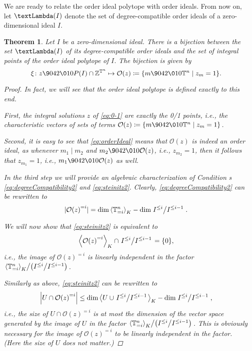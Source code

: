 \documentclass[11pt,oneside,english]{amsart}
\makeatletter
\numberwithin{equation}{section}
\numberwithin{figure}{section}
\theoremstyle{plain}
\newtheorem{thm}{Theorem}[section]
\theoremstyle{definition}
\theoremstyle{definition}
\theoremstyle{remark}
\theoremstyle{plain}
\theoremstyle{plain}
\theoremstyle{plain}
\theoremstyle{problem@}
\makeatother
\begin{document}
We are ready to relate the order ideal polytope with
order ideals.
From now on,
let \({\textLambda}(I)\) denote the set of degree-compatible order ideals
of a zero-dimensional ideal \(I\).
\begin{thm}
  \label{thm:polytope=order-ideal}
  Let \(I\) be a zero-dimensional ideal.
  There is a bijection between
  the set ${\textLambda}(I)$ of its degree-compatible order ideals and
  the set of integral points of the order ideal polytope of \(I\).
  The bijection is given by
  \[
  \xi \colon z {\9042\010} P(I) \cap {\mathbb{Z}}^{{\mathbb{T}}^n} \mapsto
  {\mathcal{O}}(z) \coloneqq \{ m {\9042\010} {\mathbb{T}}^n \mid z_{m}= 1\}.
  \]
\begin{proof}
In fact, we will see that the order ideal polytope is defined
exactly to this end.

First,
the integral solutions \(z\) of \autoref{eq:0-1}
are exactly the 0/1 points, i.e.,
the characteristic vectors
of sets of terms ${\mathcal{O}}(z)\coloneqq \{ m {\9042\010} {\mathbb{T}}^n \mid z_{m}=1 \}$.

Second, it is easy to see that
\autoref{eq:orderIdeal} means that
${\mathcal{O}}(z)$ is indeed an order ideal, as whenever
$m_{1} \mid m_{2}$ and $m_{2}{\9042\010}{\mathcal{O}}(z)$, i.e., $z_{m_{2}}=1$, then
it follows that $z_{m_{1}}=1$, i.e., $m_{1}{\9042\010}{\mathcal{O}}(z)$ as well.

In the third step we will provide an algebraic characterization
of {Condition} s \ref{eq:degreeCompatibility2} and \ref{eq:steinitz2}.
Clearly, \autoref{eq:degreeCompatibility2}
can be rewritten to
\[
\lvert {{\mathcal{O}}(z)}^{=i} \rvert = \dim{{\left\langle {{\mathbb{T}}^n_{=i}}\right\rangle}\sb{K}} -
\dim \left. I^{\leq i} \middle/ I^{\leq i-1} \right. .
\]

We will now show that \autoref{eq:steinitz2} is equivalent
to
\begin{equation}
\label{eq:disjoint}
{{\left\langle {{{\mathcal{O}}(z)}^{=i}}\right\rangle}\sb{K}}\cap\left. I^{\leq i} \middle/ I^{\leq i-1} \right.=\{0\},
\end{equation}
i.e., the image of \({{\mathcal{O}}(z)}^{=i}\) is linearly independent in the factor
\(\left. {{\left\langle {{\mathbb{T}}^n_{=i}}\right\rangle}\sb{K}} \middle/
  \left( I^{\leq i} \middle/ I^{\leq i-1} \right) \right.\).

Similarly as above,
\autoref{eq:steinitz2}
can be rewritten to
\begin{equation*}
    \left\lvert U \cap {{\mathcal{O}}(z)}^{=i} \right\rvert \leq
      \dim{{\left\langle {U \cup \left. I^{\leq i} \middle/ I^{\leq i-1} \right.}\right\rangle}\sb{K}} -
      \dim \left. I^{\leq i} \middle/ I^{\leq i-1} \right.,
\end{equation*}
i.e., the size of \(U \cap {{\mathcal{O}}(z)}^{=i}\) is at most
the dimension of the vector space generated by the image of \(U\) in
the factor
\(\left. {{\left\langle {{\mathbb{T}}^n_{=i}}\right\rangle}\sb{K}} \middle/
  \left( I^{\leq i} \middle/ I^{\leq i-1} \right) \right.\).
This is obviously \emph{necessary} for
the image of \({{\mathcal{O}}(z)}^{=i}\) to be linearly independent in the factor.
(Here the size of \(U\) does not matter.)


\end{proof}
\end{thm}
\end{document}

